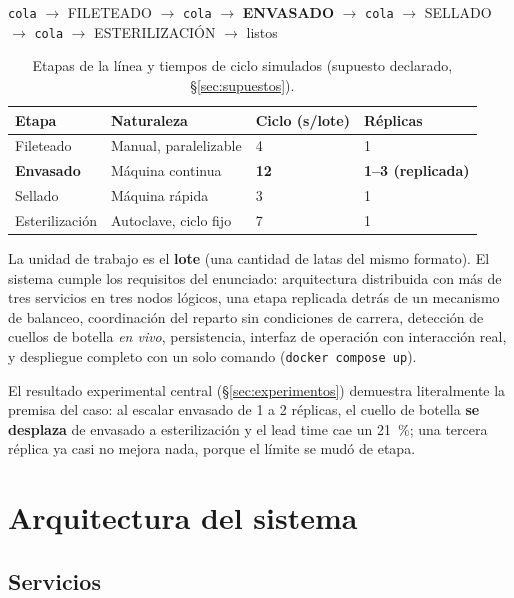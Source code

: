\documentclass[12pt,a4paper]{article}
\begin{document}
\begin{center}
\texttt{cola} $\to$ FILETEADO $\to$ \texttt{cola} $\to$ \textbf{ENVASADO} $\to$
\texttt{cola} $\to$ SELLADO $\to$ \texttt{cola} $\to$ ESTERILIZACIÓN $\to$ listos
\end{center}

\begin{table}[H]
\centering
\caption{Etapas de la línea y tiempos de ciclo simulados (supuesto declarado, §\ref{sec:supuestos}).}
\small
\begin{tabular}{L{3cm} L{4.5cm} C{2.5cm} C{2.5cm}}
\toprule
\textbf{Etapa} & \textbf{Naturaleza} & \textbf{Ciclo (s/lote)} & \textbf{Réplicas} \\
\midrule
Fileteado & Manual, paralelizable & 4 & 1 \\
\textbf{Envasado} & Máquina continua & \textbf{12} & \textbf{1--3 (replicada)} \\
Sellado & Máquina rápida & 3 & 1 \\
Esterilización & Autoclave, ciclo fijo & 7 & 1 \\
\bottomrule
\end{tabular}
\end{table}

La unidad de trabajo es el \textbf{lote} (una cantidad de latas del mismo
formato). El sistema cumple los requisitos del enunciado: arquitectura
distribuida con más de tres servicios en tres nodos lógicos, una etapa
replicada detrás de un mecanismo de balanceo, coordinación del reparto sin
condiciones de carrera, detección de cuellos de botella \emph{en vivo},
persistencia, interfaz de operación con interacción real, y despliegue completo
con un solo comando (\texttt{docker compose up}).

El resultado experimental central (§\ref{sec:experimentos}) demuestra
literalmente la premisa del caso: al escalar envasado de 1 a 2 réplicas, el
cuello de botella \textbf{se desplaza} de envasado a esterilización y el lead
time cae un 21~\%; una tercera réplica ya casi no mejora nada, porque el límite
se mudó de etapa.

\section{Arquitectura del sistema}

\subsection{Servicios}
\end{document}
